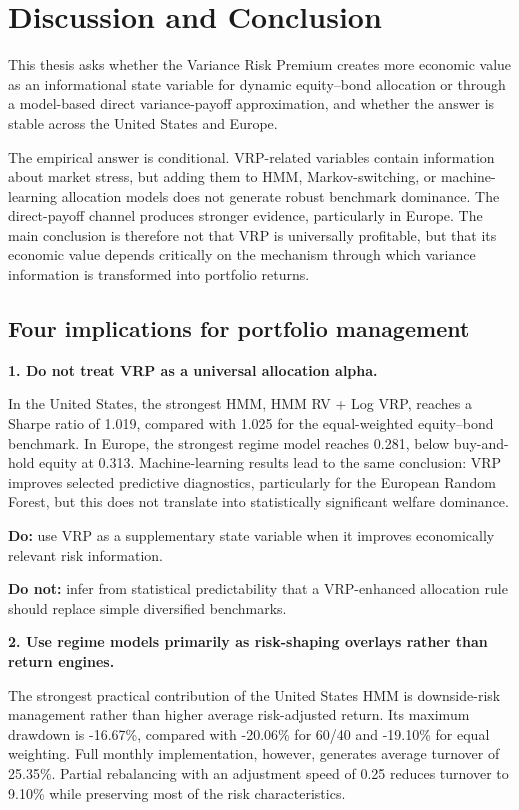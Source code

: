 \section{Discussion and Conclusion}
\label{sec:conclusion}

This thesis asks whether the Variance Risk Premium creates more economic value as an
informational state variable for dynamic equity--bond allocation or through a model-based direct
variance-payoff approximation, and whether the answer is stable across the United States and
Europe.

The empirical answer is conditional. VRP-related variables contain information about market
stress, but adding them to HMM, Markov-switching, or machine-learning allocation models does
not generate robust benchmark dominance. The direct-payoff channel produces stronger evidence,
particularly in Europe. The main conclusion is therefore not that VRP is universally profitable,
but that its economic value depends critically on the mechanism through which variance
information is transformed into portfolio returns.

\subsection{Four implications for portfolio management}

\textbf{1. Do not treat VRP as a universal allocation alpha.}

In the United States, the strongest HMM, HMM RV + Log VRP, reaches a Sharpe ratio of
1.019, compared with 1.025 for the equal-weighted equity--bond benchmark. In Europe, the
strongest regime model reaches 0.281, below buy-and-hold equity at 0.313. Machine-learning
results lead to the same conclusion: VRP improves selected predictive diagnostics, particularly
for the European Random Forest, but this does not translate into statistically significant welfare
dominance.

\textbf{Do:} use VRP as a supplementary state variable when it improves economically relevant
risk information.

\textbf{Do not:} infer from statistical predictability that a VRP-enhanced allocation rule should
replace simple diversified benchmarks.

\medskip

\textbf{2. Use regime models primarily as risk-shaping overlays rather than return engines.}

The strongest practical contribution of the United States HMM is downside-risk management
rather than higher average risk-adjusted return. Its maximum drawdown is -16.67\%, compared
with -20.06\% for 60/40 and -19.10\% for equal weighting. Full monthly implementation,
however, generates average turnover of 25.35\%. Partial rebalancing with an adjustment speed of
0.25 reduces turnover to 9.10\% while preserving most of the risk characteristics.

